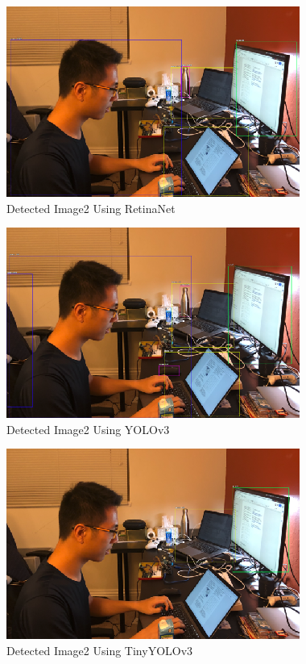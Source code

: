 \begin{figure}
  \includegraphics{figure6} 
  \caption{Detected Image2 Using RetinaNet}
\end{figure}

\begin{figure}
  \includegraphics{figure8} 
  \caption{Detected Image2 Using YOLOv3}
\end{figure}

\begin{figure}
  \includegraphics{figure7}
  \caption{Detected Image2 Using TinyYOLOv3}
\end{figure}


